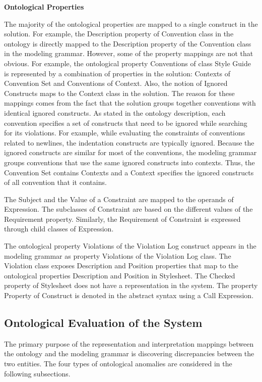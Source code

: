 \documentclass[parskip=full]{uvamscse}
\begin{document}
\textbf{Ontological Properties}

The majority of the ontological properties are mapped to a single construct in the solution. For
example, the Description property of Convention class in the ontology is directly mapped to the
Description property of the Convention class in the modeling grammar. However, some of the property
mappings are not that obvious. For example, the ontological property Conventions of class Style
Guide is represented by a combination of properties in the solution: Contexts of Convention Set and
Conventions of Context. Also, the notion of Ignored Constructs maps to the Context class in the
solution. The reason for these mappings comes from the fact that the solution groups together
conventions with identical ignored constructs. As stated in the ontology description, each
convention specifies a set of constructs that need to be ignored while searching for its violations.
For example, while evaluating the constraints of conventions related to newlines, the indentation
constructs are typically ignored. Because the ignored constructs are similar for most of the
conventions, the modeling grammar groups conventions that use the same ignored constructs into
contexts. Thus, the Convention Set contains Contexts and a Context specifies the ignored constructs
of all convention that it contains.

The Subject and the Value of a Constraint are mapped to the operands of Expression. The subclasses
of Constraint are based on the different values of the Requirement property. Similarly, the
Requirement of Constraint is expressed through child classes of Expression.

The ontological property Violations of the Violation Log construct appears in the modeling grammar
as property Violations of the Violation Log class. The Violation class exposes Description and
Position properties that map to the ontological properties Description and Position in Stylesheet.
The Checked property of Stylesheet does not have a representation in the system. The property
Property of Construct is denoted in the abstract syntax using a Call Expression.

\subsection{Ontological Evaluation of the System}

The primary purpose of the representation and interpretation mappings between the ontology and the
modeling grammar is discovering discrepancies between the two entities. The four types of
ontological anomalies are considered in the following subsections.
\end{document}
